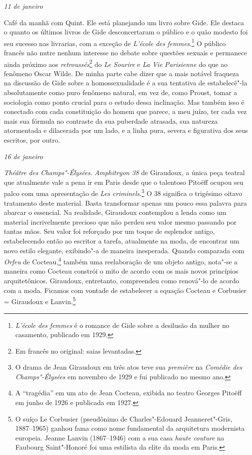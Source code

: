 \bigskip

\begin{flushright}
\emph{11 de janeiro}
\end{flushright}

Café da manhã com Quint. Ele está planejando um
livro sobre Gide. Ele destaca o quanto os últimos livros de Gide
desconcertaram o público e o quão modesto foi seu sucesso nas livrarias,
com a exceção de \emph{L'école des femmes}.\footnote{\emph{L'école
  des femmes} é o romance de Gide sobre a desilusão da mulher no
  casamento, publicado em 1929. \versal{[N.~O.]}} O público francês não nutre nenhum
interesse no debate sobre questões sexuais e permanece ainda próximo aos
\emph{retroussés}\footnote{Em francês no original: saias levantadas. \versal{[N.~T.]}} do \emph{Le Sourire} e \emph{La Vie Parisienne} do
que ao fenômeno Oscar Wilde. De minha parte cabe dizer que a mais
notável fraqueza na discussão de Gide sobre a homossexualidade é a sua
tentativa de estabelecê"-la absolutamente como puro fenômeno natural, em
vez de, como Proust, tomar a sociologia como ponto crucial para o estudo
dessa inclinação. Mas também isso é conectado com cada constituição do
homem que parece, a meu juízo, ter cada vez mais sua fórmula no
contraste da sua puberdade atrasada, sua natureza atormentada e
dilacerada por um lado, e a linha pura, severa e figurativa dos seus
escritos, por outro.

\begin{flushright}
\emph{16 de janeiro}
\end{flushright}

\emph{Théâtre des Champs"-Élysées}. \emph{Amphitryon 38} de
Giraudoux, a única peça teatral que atualmente vale a pena ir em Paris
desde que o talentoso Pitoëff ocupou seu palco com uma apresentação de
\emph{Les criminels}.\footnote{O drama de Jean Giraudoux em três
  atos teve sua \emph{première} na \emph{Comédie des Champs"-Élysées} em
  novembro de 1929 e fui publicado no mesmo ano. \versal{[N.~O.]}} O 38 significa o
trigésimo oitavo tratamento deste material. Basta transformar apenas um
pouco essa palavra para abarcar o essencial. Na realidade, Giraudoux
contemplou a lenda como um material incrivelmente precioso que não
perdeu seu valor mesmo passando por tantas mãos. Seu valor foi
reforçado por um toque de esplendor antigo, estabelecendo então ao
escritor a tarefa, atualmente na moda, de encontrar um novo estilo
elegante, exibindo"-a de maneira inesperada. Quando comparada com
\emph{Orfeu} de Cocteau,\footnote{A ``tragédia'' em um ato de
  Jean Cocteau, exibida no teatro Georges Pitoëff em junho de 1926 e
  publicada em 1927. \versal{[N.~O.]}} também uma reelaboração de um objeto antigo,
nota"-se a maneira como Cocteau constrói o mito de acordo com os mais
novos princípios arquitetônicos. Giraudoux, entretanto, compreendeu como
renová"-lo de acordo com a moda. Ficamos com vontade de estabelecer a
equação Cocteau e Corbusier = Giraudoux e Lanvin.\footnote{O suíço Le
  Corbusier (pseudônimo de Charles"-Edouard Jeanneret"-Gris, 1887--1965) ganhou
  fama como nome fundamental da arquitetura modernista europeia. Jeanne
  Lanvin (1867--1946) com a sua casa \emph{haute couture} na Faubourg
  Saint"-Honoré foi uma estilista da elite da moda em Paris. \versal{[N.~O.]}}

